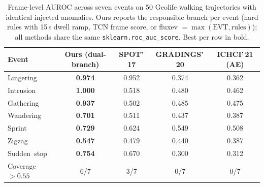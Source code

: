 \begin{table}[t]
\centering
\caption{Frame-level AUROC across seven events on 50 Geolife walking trajectories with identical injected anomalies. Ours reports the responsible branch per event (hard rules with 15\,s dwell ramp, TCN frame score, or fluxev $=\max(\mathrm{EVT},\text{rules})$); all methods share the same \texttt{sklearn.roc\_auc\_score}. Best per row in bold.}
\label{tab:lit}
\begin{tabular}{lcccc}
\hline
\textbf{Event} & \textbf{Ours (dual-branch)} & \textbf{SPOT'\,17} & \textbf{GRADINGS'\,20} & \textbf{ICHCI'\,21 (AE)} \\
\hline
Lingering & \textbf{0.974} & 0.952 & 0.374 & 0.362 \\
Intrusion & \textbf{1.000} & 0.518 & 0.480 & 0.462 \\
Gathering & \textbf{0.937} & 0.502 & 0.485 & 0.475 \\
Wandering & \textbf{0.701} & 0.511 & 0.437 & 0.387 \\
Sprint & \textbf{0.729} & 0.624 & 0.549 & 0.508 \\
Zigzag & \textbf{0.547} & 0.479 & 0.440 & 0.387 \\
Sudden~stop & \textbf{0.754} & 0.670 & 0.300 & 0.312 \\
\hline
Coverage $>0.55$ & 6/7 & 3/7 & 0/7 & 0/7 \\
\hline
\end{tabular}
\end{table}